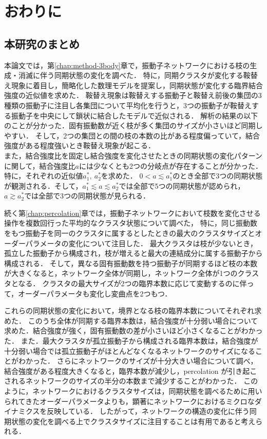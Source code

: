 \documentclass[../main]{subfiles}
\begin{document}
\chapter{おわりに}
\label{chap:summary}
\section{本研究のまとめ}
本論文では，第\ref{chap:method-3body}章で，振動子ネットワークにおける枝の生成・消滅に伴う同期状態の変化を調べた．
特に，同期クラスタが変化する鞍替え現象に着目し，簡略化した数理モデルを提案し，同期状態が変化する臨界結合強度の近似値を求めた．
鞍替え現象は鞍替えする振動子と鞍替え前後の集団の3種類の振動子に注目し各集団について平均化を行うと，3つの振動子が鞍替えする振動子を中央にして鎖状に結合したモデルで近似される．
解析の結果の以下のことが分かった．固有振動数が近く枝が多く集団のサイズが小さいほど同期しやすい．
そして，2つの集団との間の枝の本数の比がある程度偏っていて，結合強度がある程度強いとき鞍替え現象が起こる．\\
また，結合強度比を固定し結合強度を変化させたときの同期状態の変化パターンに関して，結合強度比$a$には少なくとも2つの分岐点が存在することが分かった．特に，それぞれの近似値$a^\ast_1,\ a^\ast_2$を求めた．
$0<a\lesssim a^\ast_1$のとき全部で3つの同期状態が観測される．そして，$a^\ast_1\lesssim a\lesssim a^\ast_2$では全部で5つの同期状態が認められ，$a\gtrsim a^\ast_2$では全部で3つの同期状態が見られる．

続く第\ref{chap:percolation}章では，振動子ネットワークにおいて枝数を変化させる操作を複数回行った平均的なクラスタ状態について調べた，
特に，同じ振動数をもつ振動子を同一のクラスタに属するとしたときの最大のクラスタサイズとオーダーパラメータの変化について注目した．
最大クラスタは枝が少ないとき，孤立した振動子から構成され，枝が増えると最大の連結成分に属する振動子から構成される．
そして，異なる固有振動数を持つ振動子が同期するほど枝の本数が大きくなると，ネットワーク全体が同期し，ネットワーク全体が1つのクラスタとなる．
クラスタの最大サイズが2つの臨界本数に応じて変動するのに伴って，オーダーパラメータも変化し変曲点を2つもつ．

これらの同期状態の変化において，境界となる枝の臨界本数についてそれぞれ求めた．
このうち全体が同期する臨界本数は，結合強度が十分弱い場合について求めた．結合強度が強く，固有振動数の差が小さいほど小さくなることがわかった．
また．最大クラスタが孤立振動子から構成される臨界本数は，結合強度が十分弱い場合では孤立振動子がほとんどなくなるネットワークのサイズになることがわかった．
さらにネットワークのサイズが十分大きい場合について調べ，結合強度がある程度大きくなると，臨界本数が減少し，percolation が引き起こされるネットワークのサイズの半分の本数まで減少することがわかった．
このように，ネットワークにおけるクラスタサイズは，同期状態を調べるために用いられてきたオーダーパラメータよりも，顕著にネットワークにおけるミクロなダイナミクスを反映している．
したがって，ネットワークの構造の変化に伴う同期状態の変化を調べる上でクラスタサイズに注目することは有用であると考えられる．
\end{document}
